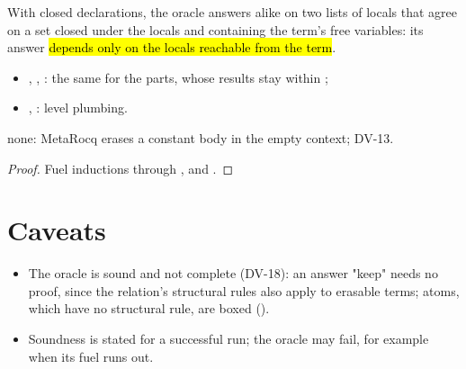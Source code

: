 \begin{lemma}
  \label{lem:EraseProof-Pure-isErasable_agree}
  \leanok
   With closed declarations, the oracle answers alike on two lists of locals that
  agree on a set  closed under the locals and containing the term's free variables: its
  answer \hl{depends only on the locals reachable from the term}.
  \begin{itemize}
  \item {}, , : the same for the parts,
        whose results stay within ;
  \item {}, : level plumbing.
  \end{itemize}
   none: MetaRocq erases a constant body in the empty context; DV-13.
\end{lemma}
\begin{proof}
  \leanok
   Fuel inductions through ,  and .
\end{proof}

\section*{Caveats}
\begin{itemize}
\item {} The oracle is sound and not complete (DV-18): an answer "keep" needs no proof,
  since the relation's structural rules also apply to erasable terms; atoms, which have no
  structural rule, are boxed ().
\item {} Soundness is stated for a successful run; the oracle may fail, for example
  when its fuel runs out.
\end{itemize}
